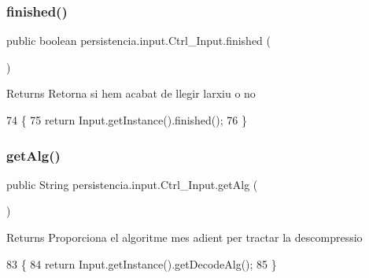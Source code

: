 \subsubsection{\texorpdfstring{finished()}{finished()}}
{\footnotesize\ttfamily public boolean persistencia.\+input.\+Ctrl\+\_\+\+Input.\+finished (\begin{DoxyParamCaption}{ }\end{DoxyParamCaption})\hspace{0.3cm}{\ttfamily [inline]}}

\begin{DoxyReturn}{Returns}
Retorna si hem acabat de llegir l\textquotesingle{}arxiu o no 
\end{DoxyReturn}

\begin{DoxyCode}
74                               \{
75         \textcolor{keywordflow}{return} Input.getInstance().finished();
76     \}
\end{DoxyCode}
\mbox{\label{classpersistencia_1_1input_1_1Ctrl__Input_aa69f79fb581f6d80c5a9609148794570}} 
\subsubsection{\texorpdfstring{get\+Alg()}{getAlg()}}
{\footnotesize\ttfamily public String persistencia.\+input.\+Ctrl\+\_\+\+Input.\+get\+Alg (\begin{DoxyParamCaption}{ }\end{DoxyParamCaption})\hspace{0.3cm}{\ttfamily [inline]}}

\begin{DoxyReturn}{Returns}
Proporciona el algoritme mes adient per tractar la descompressio 
\end{DoxyReturn}

\begin{DoxyCode}
83     \{
84         \textcolor{keywordflow}{return} Input.getInstance().getDecodeAlg();
85     \}
\end{DoxyCode}
\mbox{\label{classpersistencia_1_1input_1_1Ctrl__Input_a46d569c2f3ceb0ab6cf9900708b3316a}} 

